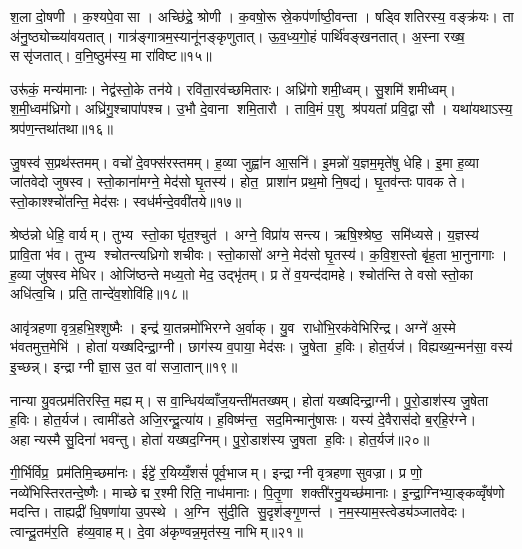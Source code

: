 श॒ला दो॒षणी। क॒श्यपे॒वासा। अच्छि॑द्रे॒ श्रोणी। क॒वषो॒रू स्रे॒कप॑र्णाष्ठी॒वन्ता। षड्विशतिरस्य॒ वङ्क्र॑यः। ता अ॑नु॒ष्ठ्योच्च्या॑वयतात्। गात्र॑ङ्गात्रम॒स्यानू॑नङ्कृणुतात्। ऊ॒व॒ध्य॒गो॒हं पार्थि॑वङ्खनतात्। अ॒स्ना रख्ष॒ ससृ॑जतात्। व॒नि॒ष्ठुम॑स्य॒ मा रा॑विष्ट॥१५॥

उरू॑कं॒ मन्य॑मानाः। नेद्व॑स्तो॒के तन॑ये। रवि॑ता॒रव॑च्छमितारः। अध्रि॑गो शमी॒ध्वम्। सु॒शमि॑ शमीध्वम्। श॒मी॒ध्वम॑ध्रिगो। अध्रि॑गु॒श्चापा॑पश्च। उ॒भौ दे॒वाना शमि॒तारौ। तावि॒मं प॒शु श्र॑पयतां प्रवि॒द्वासौ। यथा॑यथाऽस्य॒ श्रप॑ण॒न्तथा॑तथा॥१६॥\anuvakamend[ध॒त्ता॒द्बा॒हू मा रा॑विष्ट॒ तथा॑तथा]

जु॒षस्व॑ स॒प्रथ॑स्तमम्। वचो॑ दे॒वफ्स॑रस्तमम्। ह॒व्या जुह्वा॑न आ॒सनि॑। इ॒मन्नो॑ य॒ज्ञम॒मृते॑षु धेहि। इ॒मा ह॒व्या जा॑तवेदो जुषस्व। स्तो॒काना॑मग्ने॒ मेद॑सो घृ॒तस्य॑। होत॒ प्राशा॑न प्रथ॒मो नि॒षद्य॑। घृ॒तव॑न्तः पावक ते। स्तो॒काश्श्चो॑तन्ति॒ मेद॑सः। स्वध॑र्मन्दे॒ववी॑तये॥१७॥

श्रेष्ठ॑न्नो धेहि॒ वार्यम्। तुभ्य स्तो॒का घृ॑त॒श्चुत॑। अग्ने॒ विप्रा॑य सन्त्य। ऋषि॒श्श्रेष्ठ॒ समि॑ध्यसे। य॒ज्ञस्य॑ प्रावि॒ता भ॑व। तुभ्य श्चोतन्त्यध्रिगो शचीवः। स्तो॒कासो॑ अग्ने॒ मेद॑सो घृ॒तस्य॑। क॒वि॒श॒स्तो बृ॑ह॒ता भा॒नुनागाः। ह॒व्या जु॑षस्व मेधिर। ओजि॑ष्ठन्ते मध्य॒तो मेद॒ उद्भृ॑तम्। प्र ते॑ व॒यन्द॑दामहे। श्चोत॑न्ति ते वसो स्तो॒का अधि॑त्व॒चि। प्रति॒ तान्दे॑व॒शोवि॑हि॥१८॥\anuvakamend[दे॒ववी॑तय॒ उद्भृ॑त॒न्त्रीणि॑ च]

आवृ॑त्रहणा वृत्र॒हभि॒श्शुष्मैः। इन्द्र॑ या॒तन्नमो॑भिरग्ने अ॒र्वाक्। यु॒व राधो॑भि॒रक॑वेभिरिन्द्र। अग्ने॑ अ॒स्मे भ॑वतमुत्त॒मेभि॑। होता॑ यख्षदिन्द्रा॒ग्नी। छाग॑स्य व॒पाया॒ मेद॑सः। जु॒षेता ह॒विः। होत॒र्यज॑। विह्यख्य॒न्मन॑सा॒ वस्य॑ इ॒च्छन्न्। इन्द्राग्नी ज्ञा॒स उ॒त वा॑ सजा॒तान्॥१९॥

नान्या यु॒वत्प्रम॑तिरस्ति॒ मह्यम्। स वा॒न्धिय॑व्वाँज॒यन्ती॑मतख्षम्। होता॑ यख्षदिन्द्रा॒ग्नी। पु॒रो॒डाश॑स्य जु॒षेता ह॒विः। होत॒र्यज॑। त्वामी॑डते अजि॒रन्दू॒त्या॑य। ह॒विष्म॑न्त॒ सद॒मिन्मानु॑षासः। यस्य॑ दे॒वैरास॑दो ब॒र्‌हि॒र॑ग्ने। अहान्यस्मै सु॒दिना॑ भवन्तु। होता॑ यख्षद॒ग्निम्। पु॒रो॒डाश॑स्य जु॒षता ह॒विः। होत॒र्यज॑॥२०॥\anuvakamend[स॒जा॒तान॒ग्निन्द्वे च॑]

गी॒र्भिर्विप्र॒ प्रम॑तिमि॒च्छमा॑नः। ईट्टे॑ र॒यिय्यँ॒शसं॑ पूर्व॒भाजम्। इन्द्राग्नी वृत्रहणा सुवज्रा। प्र णो॒ नव्ये॑भिस्तिरतन्दे॒ष्णैः। माच्छेद्म र॒श्मीरिति॒ नाध॑मानाः। पि॒तृ॒णा शक्ती॑रनु॒यच्छ॑मानाः। इ॒न्द्रा॒ग्निभ्या॒ङ्कव्वृँष॑णो मदन्ति। ताह्यद्री॑ धि॒षणा॑या उ॒पस्थे। अ॒ग्नि सु॑दी॒ति सु॒दृश॑ङ्गृ॒णन्त॑। न॒म॒स्याम॒स्त्वेड्य॑ञ्जातवेदः। त्वान्दू॒तम॑र॒ति ह॑व्य॒वाहम्। दे॒वा अ॑कृण्वन्न॒मृत॑स्य॒ नाभिम्॥२१॥\anuvakamend[जा॒त॒वे॒दो॒ द्वे च॑]

